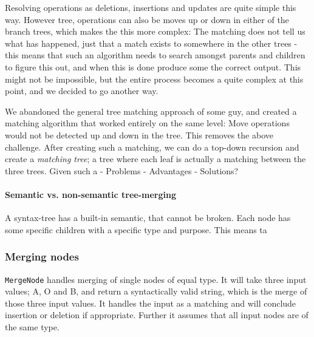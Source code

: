 \documentclass[11pt]{article}
\begin{document}
Resolving operations as deletions, insertions and updates are quite simple this way. However tree, operations can also be moves up or down in either of the branch trees, which makes the this more complex: The matching does not tell us what has happened, just that a match exists to somewhere in the other trees - this means that such an algorithm needs to search amongst parents and children to figure this out, and when this is done produce some the correct output. This might not be impossible, but the entire process becomes a quite complex at this point, and we decided to go another way.

We abandoned the general tree matching approach of some guy, and created a matching algorithm that worked entirely on the same level: Move operations would not be detected up and down in the tree. This removes the above challenge. After creating such a matching, we can do a top-down recursion and create a \textit{matching tree}; a tree where each leaf is actually a matching between the three trees. Given such a 
- Problems
- Advantages
- Solutions?

\paragraph{Semantic vs. non-semantic tree-merging} A syntax-tree has a built-in semantic, that cannot be broken. Each node has some specific children with a specific type and purpose. This means ta


%

\subsubsection{Merging nodes}
\texttt{MergeNode} handles merging of single nodes of equal type. It will take three input values; A, O and B, and return a syntactically valid string, which is the merge of those three input values. It handles the input as a matching and will conclude insertion or deletion if appropriate. Further it assumes that all input nodes are of the same type.
\end{document}
